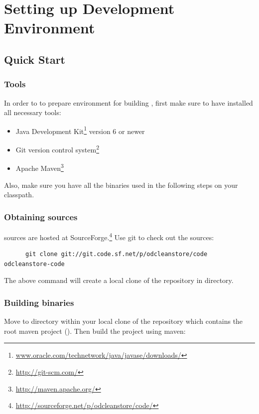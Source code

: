 \chapter{Setting up Development Environment}

\section{Quick Start}
\subsection{Tools}
	In order to to prepare environment for building \odcs, first make sure to have installed all necessary tools:

\begin{itemize}
	\item Java Development Kit\footnote{\url{www.oracle.com/technetwork/java/javase/downloads/}} version 6 or newer
	\item Git version control system\footnote{\url{http://git-scm.com/}}
	\item Apache Maven\footnote{\url{http://maven.apache.org/}}
\end{itemize}

Also, make sure you have all the binaries used in the following steps on your classpath. 

\subsection{Obtaining sources} 
\odcs sources are hosted at SourceForge.\footnote{\url{http://sourceforge.net/p/odcleanstore/code/}} Use git to check out the sources:

\begin{verbatim}
      git clone git://git.code.sf.net/p/odcleanstore/code odcleanstore-code
\end{verbatim}

The above command will create a local clone of the repository in  directory.

\subsection{Building binaries}
Move to directory  within your local clone of the repository which contains the root maven project (). Then build the project using maven:

